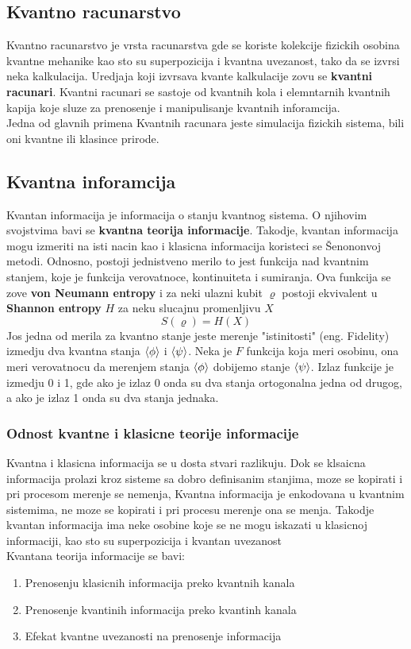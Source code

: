 \documentclass[12pt, letterpaper, oneside]{article}
\begin{document}
\subsection{Kvantno racunarstvo}
Kvantno racunarstvo je vrsta racunarstva gde se koriste kolekcije fizickih osobina kvantne mehanike kao sto su superpozicija i kvantna uvezanost,
tako da se izvrsi neka kalkulacija. Uredjaja koji izvrsava kvante kalkulacije zovu se \textbf{kvantni racunari}.
Kvantni racunari se sastoje od kvantnih kola i elemntarnih kvantnih kapija koje sluze za prenosenje i manipulisanje kvantnih inforamcija.
\cite{nielsen_chuang_10th} \\
Jedna od glavnih primena Kvantnih racunara jeste simulacija fizickih sistema, bili oni kvantne ili klasince prirode.
\subsection{Kvantna inforamcija}
Kvantan informacija je informacija o stanju kvantnog sistema. O njihovim svojstvima bavi se \textbf{kvantna teorija informacije}.
Takodje, kvantan informacija mogu izmeriti na isti nacin kao i klasicna informacija koristeci se Šenononvoj metodi. 
Odnosno, postoji jednistveno merilo to jest funkcija nad kvantnim stanjem, koje je funkcija verovatnoce, kontinuiteta i sumiranja.\cite{vlatko_v}
Ova funkcija se zove \textbf{von Neumann entropy} i za neki ulazni kubit $\varrho$ postoji ekvivalent u  \textbf{Shannon entropy} $H$
za neku slucajnu promenljivu $X$
\[
    S(\varrho) = H(X)
\]
Jos jedna od merila za kvantno stanje jeste merenje "istinitosti" (eng. Fidelity) izmedju dva kvantna stanja $ \braket{\phi}$ i $\braket{\psi}$.
Neka je $F$ funkcija koja meri osobinu, ona meri verovatnocu da merenjem stanja $\braket{\phi}$ dobijemo stanje $\braket{\psi}$.
Izlaz funkcije je izmedju 0 i 1, gde ako je izlaz 0 onda su dva stanja ortogonalna jedna od drugog, a ako je izlaz 1 onda su dva stanja jednaka.\cite{vlatko_v}
\subsubsection*{Odnost kvantne i klasicne teorije informacije}
Kvantna i klasicna informacija se u dosta stvari razlikuju. Dok se klsaicna informacija prolazi kroz sisteme sa dobro definisanim stanjima, moze se kopirati i pri procesom merenje se nemenja,
Kvantna informacija je enkodovana u kvantnim sistemima, ne moze se kopirati i pri procesu merenje ona se menja. Takodje kvantan informacija ima neke osobine koje se ne
mogu iskazati u klasicnoj informaciji, kao sto su superpozicija i kvantan uvezanost \cite{Classical&quantum_info} \\
Kvantana teorija informacije se bavi: 
\begin{enumerate}
    \item Prenosenju klasicnih informacija preko kvantnih kanala
    \item Prenosenje kvantinih informacija preko kvantinh kanala
    \item Efekat kvantne uvezanosti na prenosenje informacija
\end{enumerate}
\end{document}
